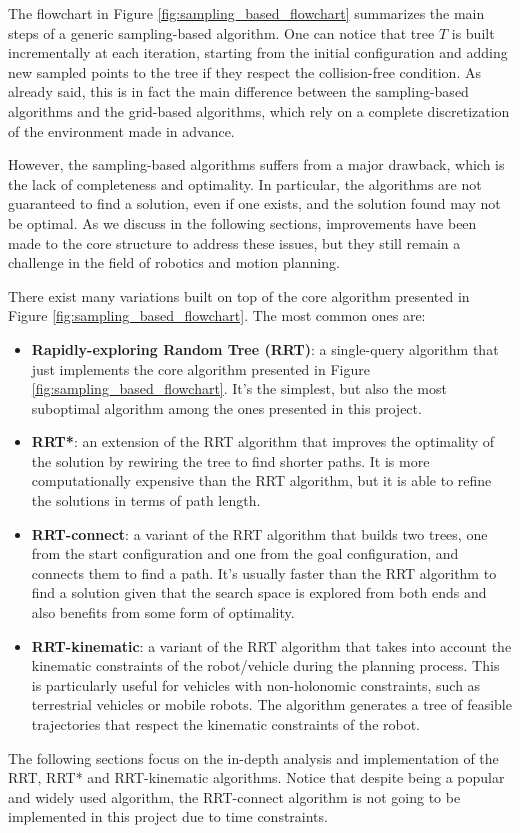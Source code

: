The flowchart in Figure \ref{fig:sampling_based_flowchart} summarizes the main steps of a generic sampling-based algorithm.
One can notice that tree $T$ is built incrementally at each iteration, starting from the initial configuration and adding new sampled points to the tree if they respect the collision-free condition.
As already said, this is in fact the main difference between the sampling-based algorithms and the grid-based algorithms, which rely on a complete discretization of the environment made in advance.

However, the sampling-based algorithms suffers from a major drawback, which is the lack of completeness and optimality.
In particular, the algorithms are not guaranteed to find a solution, even if one exists, and the solution found may not be optimal.
As we discuss in the following sections, improvements have been made to the core structure to address these issues, but they still remain a challenge in the field of robotics and motion planning.

There exist many variations built on top of the core algorithm presented in Figure \ref{fig:sampling_based_flowchart}.
The most common ones are:

\begin{itemize}
    \item \textbf{Rapidly-exploring Random Tree (RRT)}: a single-query algorithm that just implements the core algorithm presented in Figure \ref{fig:sampling_based_flowchart}. It's the simplest, but also the most suboptimal algorithm among the ones presented in this project.
    \item \textbf{RRT*}: an extension of the RRT algorithm that improves the optimality of the solution by rewiring the tree to find shorter paths. It is more computationally expensive than the RRT algorithm, but it is able to refine the solutions in terms of path length.
    \item \textbf{RRT-connect}: a variant of the RRT algorithm that builds two trees, one from the start configuration and one from the goal configuration, and connects them to find a path. It's usually faster than the RRT algorithm to find a solution given that the search space is explored from both ends and also benefits from some form of optimality.
    \item \textbf{RRT-kinematic}: a variant of the RRT algorithm that takes into account the kinematic constraints of the robot/vehicle during the planning process. This is particularly useful for vehicles with non-holonomic constraints, such as terrestrial vehicles or mobile robots. The algorithm generates a tree of feasible trajectories that respect the kinematic constraints of the robot.
\end{itemize}

The following sections focus on the in-depth analysis and implementation of the RRT, RRT* and RRT-kinematic algorithms.
Notice that despite being a popular and widely used algorithm, the RRT-connect algorithm is not going to be implemented in this project due to time constraints.
